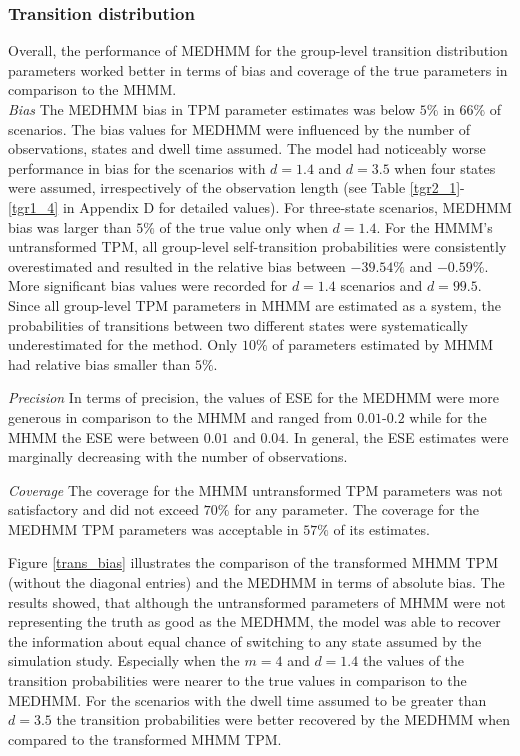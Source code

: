 \subsubsection{Transition distribution}
Overall, the performance of MEDHMM for the group-level transition distribution parameters worked better in terms of bias and coverage of the true parameters in comparison to the MHMM. \\
\emph{Bias}     The MEDHMM bias in TPM parameter estimates was below $5\%$ in $66\%$ of scenarios. The bias values for MEDHMM were influenced by the number of observations, states and dwell time assumed. The model had noticeably worse performance in bias for the scenarios with $d=1.4$ and $d=3.5$ when four states were assumed, irrespectively of the observation length (see Table \ref{tgr2_1}-\ref{tgr1_4} in Appendix D for detailed values). For three-state scenarios, MEDHMM bias was larger than $5\%$ of the true value only when $d=1.4$. For the HMMM's untransformed TPM, all group-level self-transition probabilities were consistently overestimated and resulted in the relative bias between $-39.54\%$ and $-0.59\%$. More significant bias values were recorded for $d=1.4$ scenarios and $d=99.5$. \newpage Since all group-level TPM parameters in MHMM are estimated as a system, the probabilities of transitions between two different states were systematically underestimated for the method. Only $10\%$ of parameters estimated by MHMM had relative bias smaller than $5\%$.

\emph{Precision}    In terms of precision, the values of ESE for the MEDHMM were more generous in comparison to the MHMM and ranged from $0.01$-$0.2$ while for the MHMM the ESE were between $0.01$ and $0.04$. In general, the ESE estimates were marginally decreasing with the number of observations.

\emph{Coverage}     The coverage for the MHMM untransformed TPM parameters was not satisfactory and did not exceed $70\%$ for any parameter. The coverage for the MEDHMM TPM parameters was acceptable in $57\%$ of its estimates. 

Figure \ref{trans_bias} illustrates the comparison of the transformed MHMM TPM (without the diagonal entries) and the MEDHMM in terms of absolute bias. The results showed, that although the untransformed parameters of MHMM were not representing the truth as good as the MEDHMM, the model was able to recover the information about equal chance of switching to any state assumed by the simulation study. Especially when the $m=4$ and $d=1.4$ the values of the transition probabilities were nearer to the true values in comparison to the MEDHMM. For the scenarios with the dwell time assumed to be greater than $d=3.5$ the transition probabilities were better recovered by the MEDHMM when compared to the transformed MHMM TPM. 

